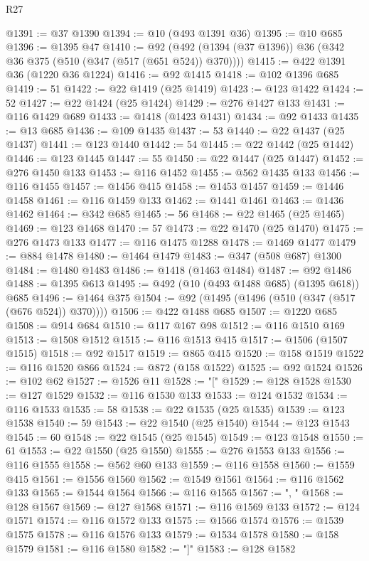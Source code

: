 \begin{lexlean}{R27}
\begin{coremodule}
@1391 := @37 @1390
@1394 := @10 (@493 @1391 @36)
@1395 := @10 @685
@1396 := @1395 @47
@1410 := @92 (@492 (@1394 (@37 @1396)) @36 (@342 @36 @375 (@510 (@347 (@517 (@651 @524)) @370))))
@1415 := @422 @1391 @36 (@1220 @36 @1224)
@1416 := @92 @1415
@1418 := @102 @1396 @685
@1419 := 51
@1422 := @22 @1419 (@25 @1419)
@1423 := @123 @1422
@1424 := 52
@1427 := @22 @1424 (@25 @1424)
@1429 := @276 @1427 @133
@1431 := @116 @1429 @689
@1433 := @1418 (@1423 @1431)
@1434 := @92 @1433
@1435 := @13 @685
@1436 := @109 @1435
@1437 := 53
@1440 := @22 @1437 (@25 @1437)
@1441 := @123 @1440
@1442 := 54
@1445 := @22 @1442 (@25 @1442)
@1446 := @123 @1445
@1447 := 55
@1450 := @22 @1447 (@25 @1447)
@1452 := @276 @1450 @133
@1453 := @116 @1452
@1455 := @562 @1435 @133
@1456 := @116 @1455
@1457 := @1456 @415
@1458 := @1453 @1457
@1459 := @1446 @1458
@1461 := @116 @1459 @133
@1462 := @1441 @1461
@1463 := @1436 @1462
@1464 := @342 @685
@1465 := 56
@1468 := @22 @1465 (@25 @1465)
@1469 := @123 @1468
@1470 := 57
@1473 := @22 @1470 (@25 @1470)
@1475 := @276 @1473 @133
@1477 := @116 @1475 @1288
@1478 := @1469 @1477
@1479 := @884 @1478
@1480 := @1464 @1479
@1483 := @347 (@508 @687) @1300
@1484 := @1480 @1483
@1486 := @1418 (@1463 @1484)
@1487 := @92 @1486
@1488 := @1395 @613
@1495 := @492 (@10 (@493 @1488 @685) (@1395 @618)) @685
@1496 := @1464 @375
@1504 := @92 (@1495 (@1496 (@510 (@347 (@517 (@676 @524)) @370))))
@1506 := @422 @1488 @685
@1507 := @1220 @685
@1508 := @914 @684
@1510 := @117 @167 @98
@1512 := @116 @1510 @169
@1513 := @1508 @1512
@1515 := @116 @1513 @415
@1517 := @1506 (@1507 @1515)
@1518 := @92 @1517
@1519 := @865 @415
@1520 := @158 @1519
@1522 := @116 @1520 @866
@1524 := @872 (@158 @1522)
@1525 := @92 @1524
@1526 := @102 @62
@1527 := @1526 @11
@1528 := "["
@1529 := @128 @1528
@1530 := @127 @1529
@1532 := @116 @1530 @133
@1533 := @124 @1532
@1534 := @116 @1533
@1535 := 58
@1538 := @22 @1535 (@25 @1535)
@1539 := @123 @1538
@1540 := 59
@1543 := @22 @1540 (@25 @1540)
@1544 := @123 @1543
@1545 := 60
@1548 := @22 @1545 (@25 @1545)
@1549 := @123 @1548
@1550 := 61
@1553 := @22 @1550 (@25 @1550)
@1555 := @276 @1553 @133
@1556 := @116 @1555
@1558 := @562 @60 @133
@1559 := @116 @1558
@1560 := @1559 @415
@1561 := @1556 @1560
@1562 := @1549 @1561
@1564 := @116 @1562 @133
@1565 := @1544 @1564
@1566 := @116 @1565
@1567 := ", "
@1568 := @128 @1567
@1569 := @127 @1568
@1571 := @116 @1569 @133
@1572 := @124 @1571
@1574 := @116 @1572 @133
@1575 := @1566 @1574
@1576 := @1539 @1575
@1578 := @116 @1576 @133
@1579 := @1534 @1578
@1580 := @158 @1579
@1581 := @116 @1580
@1582 := "]"
@1583 := @128 @1582

\end{coremodule}
\end{lexlean}
